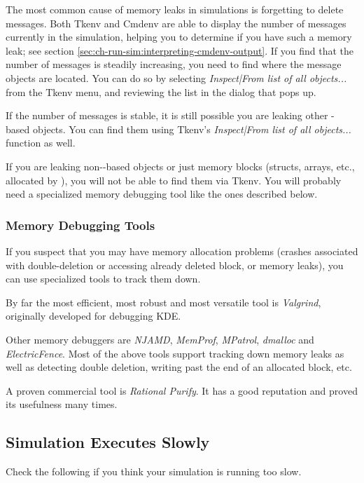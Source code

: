 The most common cause of memory leaks in {\opp} simulations is
forgetting to delete messages. Both Tkenv and Cmdenv are able
to display the number of messages currently in the simulation,
helping you to determine if you have such a memory leak;
see section \ref{sec:ch-run-sim:interpreting-cmdenv-output}.
If you find that the number of messages is steadily increasing,
you need to find where the message objects are located. You can do so
by selecting \textit{Inspect|From list of all objects...} from
the Tkenv menu, and reviewing the list in the dialog that pops up.

If the number of messages is stable, it is still possible
you are leaking other -based objects. You can
find them using Tkenv's \textit{Inspect|From list of all objects...}
function as well.

If you are leaking non--based objects or just
memory blocks (structs, arrays, etc., allocated by ),
you will not be able to find them via Tkenv. You will probably need
a specialized memory debugging tool like the ones described below.

\subsubsection{Memory Debugging Tools}

If you suspect that you may have memory allocation problems
(crashes associated with double-deletion or accessing already
deleted block, or memory leaks), you can use specialized tools
to track them down.

By far the most efficient, most robust and most versatile tool
is \textit{Valgrind}, originally developed for debugging KDE.

Other memory debuggers are \textit{NJAMD}, \textit{MemProf},
\textit{MPatrol}, \textit{dmalloc} and \textit{ElectricFence}.
Most of the above tools support tracking down memory leaks as well as
detecting double deletion, writing past the end of an allocated block, etc.

A proven commercial tool is \textit{Rational Purify}. It has
a good reputation and proved its usefulness many times.

\subsection{Simulation Executes Slowly}

Check the following if you think your simulation is running too slow.

